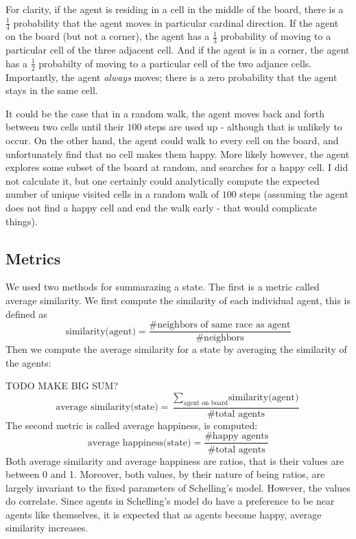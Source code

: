 \documentclass[11pt,twoside]{amsart}
\theoremstyle{theorem}
\theoremstyle{definition}
\theoremstyle{remark}
\begin{document}
For clarity, if the agent is residing in a cell in the middle of the board, there is a $\frac{1}{4}$ probability that the agent moves in particular cardinal direction.
If the agent on the board (but not a corner), the agent has a $\frac{1}{3}$ probability of moving to a particular cell of the three adjacent cell.
And if the agent is in a corner, the agent has a $\frac{1}{2}$ probabilty of moving to a particular cell of the two adjance cells.
Importantly, the agent \emph{always} moves; there is a zero probability that the agent stays in the same cell.

It could be the case that in a random walk, the agent moves back and forth between two cells until their $100$ steps are used up - although that is unlikely to occur. 
On the other hand, the agent could walk to every cell on the board, and unfortunately find that no cell makes them happy. 
More likely however, the agent explores some subset of the board at random, and searches for a happy cell.
I did not calculate it, but one certainly could analytically compute the expected number of unique visited cells in a random walk of $100$ steps (assuming the agent does not find a happy cell and end the walk early - that would complicate things).

\subsection{Metrics}
We used two methods for summarazing a state. 
The first is a metric called average similarity. 
We first compute the similarity of each individual agent, this is defined as
\[ \text{similarity(agent)} = \frac{\text{\# neighbors of same race as agent}}{\text{\# neighbors}} \]
Then we compute the average similarity for a state by averaging the similarity of the agents:

TODO MAKE BIG SUM?
\[\text{average similarity(state)} = \frac{\sum_{\text{agent on board}} \text{similarity(agent)}} {\text{\# total agents}} \]
The second metric is called average happiness, is computed:
\[ \text{average happiness(state)} = \frac{\text{\# happy agents}}{\text{\# total agents}} \]
Both average similarity and average happiness are ratios, that is their values are between 0 and 1. 
Moreover, both values, by their nature of being ratios, are largely invariant to the fixed parameters of Schelling's model. 
However, the values do correlate. Since agents in Schelling's model do have a preference to be near agents like themselves, it is expected that as agents become happy, average similarity increases. 
\end{document}
